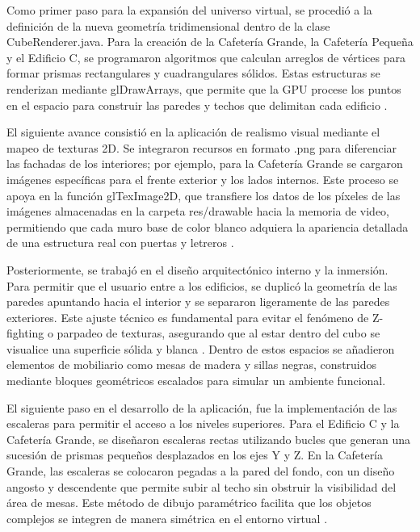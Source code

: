 \documentclass[conference]{IEEEtran}
\begin{document}
Como primer paso para la expansión del universo virtual, se procedió a la definición de la nueva geometría tridimensional dentro de la clase CubeRenderer.java. Para la creación de la Cafetería Grande, la Cafetería Pequeña y el Edificio C, se programaron algoritmos que calculan arreglos de vértices para formar prismas rectangulares y cuadrangulares sólidos. Estas estructuras se renderizan mediante glDrawArrays, que permite que la GPU procese los puntos en el espacio para construir las paredes y techos que delimitan cada edificio \cite{KhronosDrawArrays2026}.

\vspace{0.2cm}

El siguiente avance consistió en la aplicación de realismo visual mediante el mapeo de texturas 2D. Se integraron recursos en formato .png para diferenciar las fachadas de los interiores; por ejemplo, para la Cafetería Grande se cargaron imágenes específicas para el frente exterior y los lados internos. Este proceso se apoya en la función glTexImage2D, que transfiere los datos de los píxeles de las imágenes almacenadas en la carpeta res/drawable hacia la memoria de video, permitiendo que cada muro base de color blanco adquiera la apariencia detallada de una estructura real con puertas y letreros \cite{KhronosTexImage2026}.

\vspace{0.2cm}

Posteriormente, se trabajó en el diseño arquitectónico interno y la inmersión. Para permitir que el usuario entre a los edificios, se duplicó la geometría de las paredes apuntando hacia el interior y se separaron ligeramente de las paredes exteriores. Este ajuste técnico es fundamental para evitar el fenómeno de Z-fighting o parpadeo de texturas, asegurando que al estar dentro del cubo se visualice una superficie sólida y blanca \cite{Akenine2018}. Dentro de estos espacios se añadieron elementos de mobiliario como mesas de madera y sillas negras, construidos mediante bloques geométricos escalados para simular un ambiente funcional.

\vspace{0.2cm}

El siguiente paso en el desarrollo de la aplicación, fue la implementación de las escaleras para permitir el acceso a los niveles superiores. Para el Edificio C y la Cafetería Grande, se diseñaron escaleras rectas utilizando bucles que generan una sucesión de prismas pequeños desplazados en los ejes Y y Z. En la Cafetería Grande, las escaleras se colocaron pegadas a la pared del fondo, con un diseño angosto y descendente que permite subir al techo sin obstruir la visibilidad del área de mesas. Este método de dibujo paramétrico facilita que los objetos complejos se integren de manera simétrica en el entorno virtual \cite{AndroidGraphics2026}.
\end{document}
